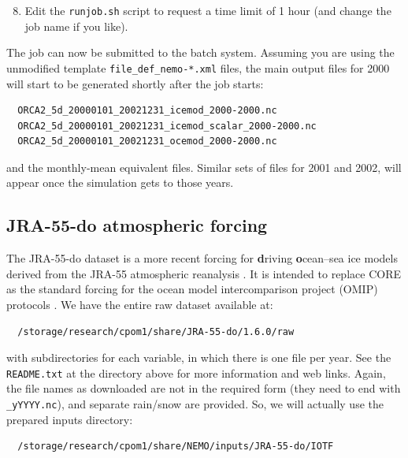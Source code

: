 \begin{enumerate}\setcounter{enumi}{7}
    \item Edit the \verb|runjob.sh| script to request a time limit of 1 hour (and change the job name if you like).
\end{enumerate}

The job can now be submitted to the batch system.
Assuming you are using the unmodified template \verb|file_def_nemo-*.xml| files, the main output files for 2000 will start to be generated shortly after the job starts:

\begingroup\small\begin{verbatim}
  ORCA2_5d_20000101_20021231_icemod_2000-2000.nc
  ORCA2_5d_20000101_20021231_icemod_scalar_2000-2000.nc
  ORCA2_5d_20000101_20021231_ocemod_2000-2000.nc
\end{verbatim}\endgroup

and the monthly-mean equivalent files.
Similar sets of files for 2001 and 2002, will appear once the simulation gets to those years.


\subsection{JRA-55-do atmospheric forcing}
\label{sec:jra-55-do}

The \mbox{JRA-55-do} dataset is a more recent forcing for \textbf{d}riving \mbox{\textbf{o}cean--sea} ice models derived from the \mbox{JRA-55} atmospheric reanalysis \citep{kobayashi2015jra-55,tsujino2018jra55do}.
It is intended to replace CORE as the standard forcing for the ocean model intercomparison project (OMIP) protocols \citep{griffies2016omip,tsujino2020evaluation}.
We have the entire raw dataset available at:

\begin{verbatim}
  /storage/research/cpom1/share/JRA-55-do/1.6.0/raw
\end{verbatim}

with subdirectories for each variable, in which there is one file per year.
See the \verb|README.txt| at the directory above for more information and web links.
Again, the file names as downloaded are not in the required form (they need to end with \verb|_yYYYY.nc|), and separate rain/snow are provided.
So, we will actually use the prepared inputs directory:

\begin{verbatim}
  /storage/research/cpom1/share/NEMO/inputs/JRA-55-do/IOTF
\end{verbatim}

